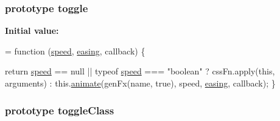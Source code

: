 \subsubsection[{\texorpdfstring{toggle}{toggle}}]{ {\bf prototype} toggle}\hypertarget{jquery-2_82_81-vsdoc_8js_a2acbc13778660c4b59c393d8e4c2eb09}{}\label{jquery-2_82_81-vsdoc_8js_a2acbc13778660c4b59c393d8e4c2eb09}
{\bfseries Initial value\+:}
\begin{DoxyCode}
= \textcolor{keyword}{function} (\hyperlink{jquery-2_82_81-vsdoc_8js_add98c90065e6563cba26ff6d2016c46c}{speed}, \hyperlink{jquery-2_82_81-vsdoc_8js_a9758a312629fa6de1744280dd6e6253b}{easing}, callback) \{
        

        \textcolor{keywordflow}{return} \hyperlink{jquery-2_82_81-vsdoc_8js_add98c90065e6563cba26ff6d2016c46c}{speed} == null || typeof \hyperlink{jquery-2_82_81-vsdoc_8js_add98c90065e6563cba26ff6d2016c46c}{speed} === \textcolor{stringliteral}{"boolean"} ?
            cssFn.apply(\textcolor{keyword}{this}, arguments) :
            this.\hyperlink{jquery-2_82_81-vsdoc_8js_a956a1d08128d41115c45b6815814a64d}{animate}(genFx(name, \textcolor{keyword}{true}), speed, \hyperlink{jquery-2_82_81-vsdoc_8js_a9758a312629fa6de1744280dd6e6253b}{easing}, callback);
    \}
\end{DoxyCode}
\subsubsection[{\texorpdfstring{toggle\+Class}{toggleClass}}]{ {\bf prototype} toggle\+Class}\hypertarget{jquery-2_82_81-vsdoc_8js_aa7d62d93d395f57a19fbbdcfd7ff87f1}{}\label{jquery-2_82_81-vsdoc_8js_aa7d62d93d395f57a19fbbdcfd7ff87f1}
